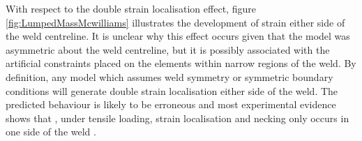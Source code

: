 

With respect to the double strain localisation effect, figure \ref{fig:LumpedMassMcwilliams}
illustrates the development of strain either side of the weld centreline. It is unclear why this effect occurs given that the model was asymmetric about the weld centreline, but it is possibly associated with the artificial constraints placed on the elements within narrow regions of the weld. By definition, any model which assumes weld symmetry or symmetric boundary conditions will generate double strain localisation either side of the weld. The predicted behaviour is likely to be erroneous and most experimental evidence shows that 
, under tensile loading, strain localisation and necking only occurs in one side of the weld \cite{Rhodes1997,Genevois2006}
\cite{Rhodes1997,Mahoney1998,Sato2001,Genevois2005,Genevois2006}. 

